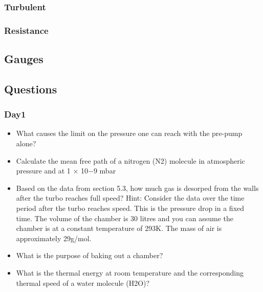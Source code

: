 \documentclass[]{article}
\begin{document}
\subsubsection{Turbulent}
\subsubsection{Resistance}
\subsection{Gauges}
\subsection{Questions}
\subsubsection{Day1}
\begin{itemize}  
	\item What causes the limit on the pressure one can reach with the pre-pump alone? 
	\item  Calculate the mean free path of a nitrogen (N2) molecule in atmospheric pressure and at 1 × 10−9 mbar 
	\item Based on the data from section 5.3, how much gas is desorped from the walls after the turbo reaches full speed? Hint: Consider the data over the time period after the turbo reaches speed. This is the pressure drop in a ﬁxed time. The volume of the chamber is 30 litres and you can assume the chamber is at a constant temperature of 293K. The mass of air is approximately 29g/mol.
	 

	\item What is the purpose of baking out a chamber? 
	\item What is the thermal energy at room temperature and the corresponding thermal speed of a water molecule (H2O)?
\end{itemize}
\end{document}
